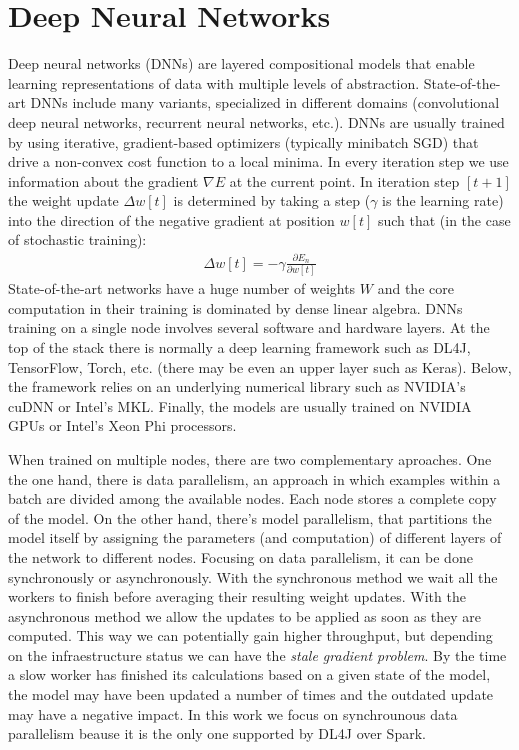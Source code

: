 \documentclass[journal]{IEEEtran}
\begin{document}
\section{Deep Neural Networks}
\label{sec:spark}

Deep neural networks (DNNs) are layered compositional models that enable learning representations of data with multiple levels of abstraction. State-of-the-art DNNs include many variants, specialized in different domains (convolutional deep neural networks, recurrent neural networks, etc.). DNNs are usually trained by using iterative, gradient-based optimizers (typically minibatch SGD) that drive a non-convex cost function to a local minima. In every iteration step we use information about the gradient $\nabla E$ at the current point. In iteration step $[t + 1]$ the weight update $\Delta w[t]$ is determined by taking a step ($\gamma$ is the learning rate) into the direction of the negative gradient at position $w[t]$ such that (in the case of stochastic training):
\begin{align}
\Delta w[t] = - \gamma \frac{\partial E_n}{\partial w[t]}
\end{align}
State-of-the-art networks have a huge number of weights $W$ and the core computation in their training is dominated by dense linear algebra. DNNs training on a single node involves several software and hardware layers. At the top of the stack there is normally a deep learning framework such as DL4J, TensorFlow, Torch, etc. (there may be even an upper layer such as Keras). Below, the framework relies on an underlying numerical library such as NVIDIA's cuDNN or Intel's MKL. Finally, the models are usually trained on NVIDIA GPUs or Intel's Xeon Phi processors. 

When trained on multiple nodes, there are two complementary aproaches. One the one hand, there is data parallelism, an approach in which examples within a batch are divided among the available nodes. Each node stores a complete copy of the model. On the other hand, there's model parallelism, that partitions the model itself by assigning the parameters (and computation) of different layers of the network to different nodes. Focusing on data parallelism, it can be done synchronously or asynchronously. With the synchronous method we wait all the workers to finish before averaging their resulting weight updates. With the asynchronous method we allow the updates to be applied as soon as they are computed. This way we can potentially gain higher throughput, but depending on the infraestructure status we can have the {\it stale gradient problem}. By the time a slow worker has finished its calculations based on a given state of the model, the model may have been updated a number of times and the outdated update may have a negative impact. In this work we focus on synchrounous data parallelism beause it is the only one supported by DL4J over Spark.
\end{document}
